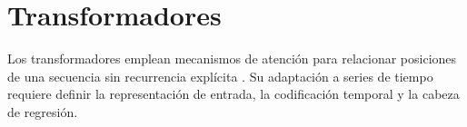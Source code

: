 \section{Transformadores}

Los transformadores emplean mecanismos de atención para relacionar posiciones de una secuencia sin recurrencia explícita \cite{vaswani2017attention}. Su adaptación a series de tiempo requiere definir la representación de entrada, la codificación temporal y la cabeza de regresión.
